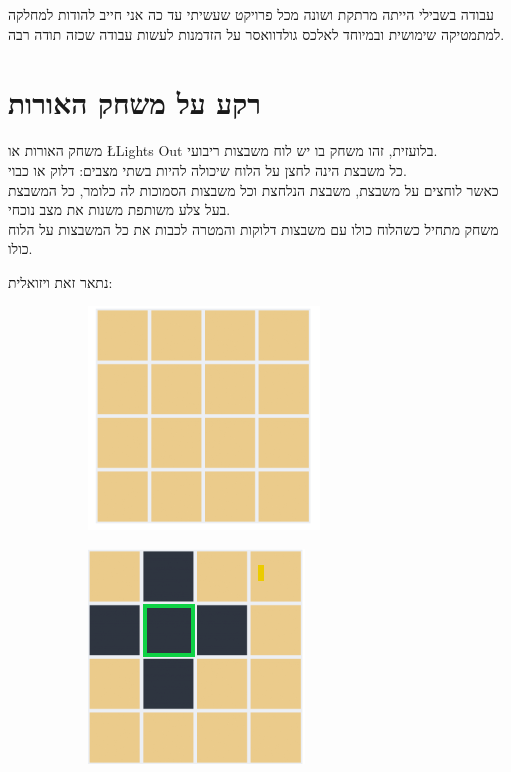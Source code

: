 \documentclass[12pt,twoside]{article}
\begin{document}
עבודה בשבילי הייתה מרתקת ושונה מכל פרויקט שעשיתי עד כה אני חייב להודות למחלקה 
למתמטיקה שימושית ובמיוחד לאלכס גולדוואסר על הזדמנות לעשות 
עבודה שכזה תודה רבה.

\newpage

\section{רקע על משחק האורות}
משחק האורות או 
\L{Lights Out}
בלועזית,
זהו משחק בו יש לוח משבצות ריבועי.
\\
כל משבצת הינה לחצן על הלוח שיכולה להיות בשתי מצבים:
דלוק או כבוי.
\\
כאשר לוחצים על משבצת, משבצת הנלחצת וכל משבצות הסמוכות לה כלומר,
כל המשבצת בעל צלע משותפת משנות את מצב נוכחי.
\\
משחק מתחיל כשהלוח כולו עם משבצות דלוקות והמטרה לכבות את כל המשבצות על הלוח כולו.

נתאר זאת ויזואלית: 

\begin{figure}[ht]
    \begin{subfigure}{.5\textwidth}
        \unsethebrew
        \caption{}
        \centering
        \includegraphics{images/4x4_start_board.PNG}
        \sethebrew
    \end{subfigure}%
    \begin{subfigure}{.5\textwidth}
        \unsethebrew
        \caption{}
        \centering
        \includegraphics{images/4x4_press.PNG}
        \sethebrew
    \end{subfigure}%
\end{figure}
\end{document}
